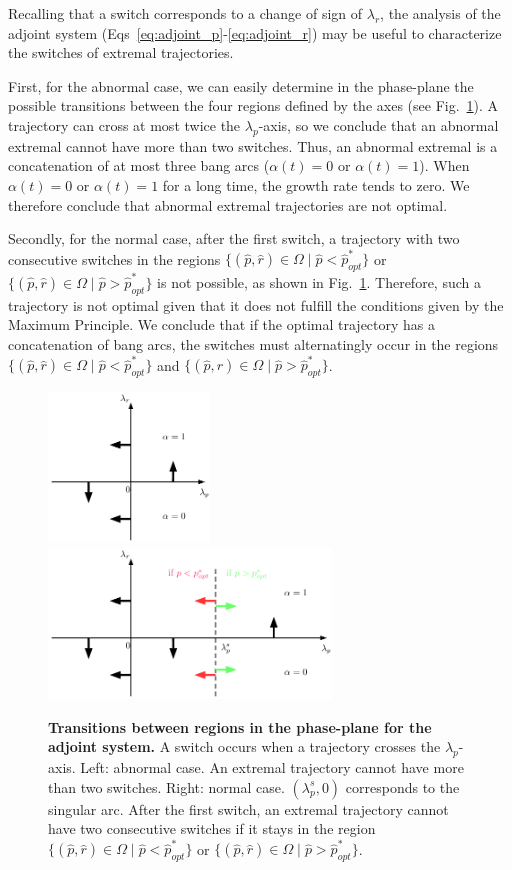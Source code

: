 Recalling that a switch corresponds to a change of sign of $\lambda_r$, the analysis of the adjoint system (Eqs~\ref{eq:adjoint_p}-\ref{eq:adjoint_r}) may be useful to characterize the switches of extremal trajectories. 

First, for the abnormal case, we can easily determine in the phase-plane the possible transitions between the four regions defined by the axes (see Fig.~\ref{fig-adj}). A trajectory can cross at most twice the $\lambda_p$-axis, so  we conclude that an abnormal extremal cannot have more than two switches. Thus, an abnormal extremal is a concatenation of at most three bang arcs ($\alpha(t)=0$ or $\alpha(t)=1$). When  $\alpha(t)=0$ or $\alpha(t)=1$ for a long time, the growth rate tends to zero. We therefore conclude that  abnormal extremal trajectories are not optimal.

Secondly, for the normal case, after the first switch, a trajectory with two consecutive switches in the regions $\{(\hat{p},\hat{r})\in \Omega \mid \hat{p}<\hat{p}_{opt}^*\}$ or $\{(\hat{p},\hat{r})\in \Omega \mid \hat{p}>\hat{p}_{opt}^*\}$ is not possible, as shown in Fig.~\ref{fig-adj}. Therefore, such a trajectory is not optimal given that it does not fulfill the conditions given by the Maximum Principle.
We conclude that if the optimal trajectory has a concatenation of bang arcs, the switches must alternatingly occur in the regions  $\{(\hat{p},\hat{r})\in \Omega \mid \hat{p}<\hat{p}_{opt}^*\}$ and $\{(\hat{p},\hat{r})\in \Omega \mid \hat{p}>\hat{p}_{opt}^*\}$.

\begin{figure}[tb]
\centering
\includegraphics[height=4cm]{Fig/adj2ab} 
\includegraphics[height=4cm]{Fig/adj2} 
\caption{\textbf{Transitions between regions in the phase-plane for the adjoint system.} A switch occurs when a trajectory crosses the $\lambda_p$-axis. Left: abnormal case. An extremal trajectory cannot have more than two switches. Right: normal case. $(\lambda_p^s,0)$ corresponds to the singular arc.  After the first switch, an extremal trajectory cannot have two consecutive switches if it stays in the region $\{(\hat{p},\hat{r})\in \Omega \mid \hat{p}<\hat{p}_{opt}^*\}$ or $\{(\hat{p},\hat{r})\in \Omega \mid \hat{p}>\hat{p}_{opt}^*\}$.}
\label{fig-adj}                               
\end{figure} 


